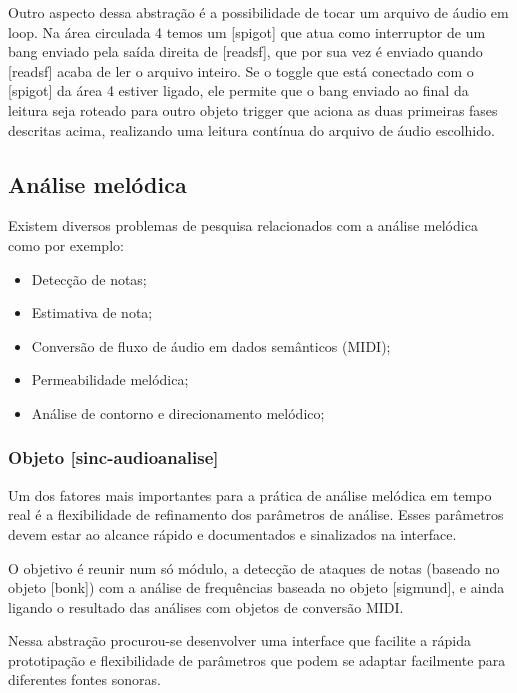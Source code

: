 \documentclass[draft]{ppgmus}
\begin{document}
Outro aspecto dessa abstração é a possibilidade de tocar um arquivo de áudio em loop.
Na área circulada 4 temos um [spigot] que atua como interruptor de um bang enviado pela
saída direita de [readsf\texttildelow], que por sua vez é enviado quando [readsf\texttildelow] 
acaba de ler o arquivo
inteiro. Se o toggle que está conectado com o [spigot] da área 4 estiver ligado, ele permite
que o bang enviado ao final da leitura seja roteado para outro objeto trigger que aciona as 
duas primeiras fases descritas acima, realizando uma leitura contínua do arquivo de áudio
escolhido.



\subsection{Análise melódica}


Existem diversos problemas de pesquisa relacionados com a
análise melódica como por exemplo:

\begin{itemize}
 \item Detecção de notas;
 \item Estimativa de nota;
 \item Conversão de fluxo de áudio em dados semânticos (MIDI);
 \item Permeabilidade melódica;
 \item Análise de contorno e direcionamento melódico;
\end{itemize}




\subsubsection{Objeto [sinc-audioanalise]}

Um dos fatores mais importantes para a prática de análise melódica
em tempo real é a flexibilidade de refinamento dos parâmetros
de análise. Esses parâmetros devem estar ao alcance rápido e documentados
e sinalizados na interface.

O objetivo é reunir num só módulo, a detecção de ataques de notas 
(baseado no objeto [bonk\texttildelow]) com a análise de frequências
baseada no objeto [sigmund\texttildelow], e ainda ligando o resultado das 
análises com objetos de conversão MIDI.


Nessa abstração procurou-se desenvolver uma interface que facilite
a rápida prototipação e flexibilidade de parâmetros que podem
se adaptar facilmente para diferentes fontes sonoras.
\end{document}
